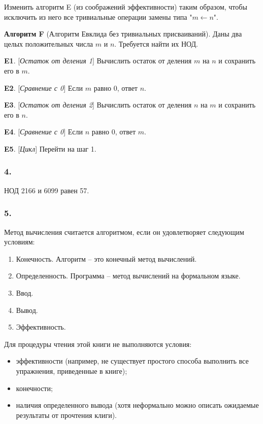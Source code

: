 \documentclass{book}
\begin{document}
Изменить алгоритм E (из соображений эффективности) таким образом, чтобы исключить из него все тривиальные операции замены типа "$m \leftarrow n$".

\textbf{Алгоритм F} (Алгоритм Евклида без тривиальных присваиваний). Даны два целых положительных числа $m$ и $n$. Требуется найти их НОД.

\textbf{E1}. [\textit{Остаток от деления 1}] Вычислить остаток от деления $m$ на $n$ и сохранить его в $m$.

\textbf{E2}. [\textit{Сравнение с 0}] Если $m$ равно 0, ответ $n$.

\textbf{E3}. [\textit{Остаток от деления 2}] Вычислить остаток от деления $n$ на $m$ и сохранить его в $n$.

\textbf{E4}. [\textit{Сравнение с 0}] Если $n$ равно 0, ответ $m$.

\textbf{E5}. [\textit{Цикл}] Перейти на шаг 1.

\subsubsection{4.}

НОД 2166 и 6099 равен 57.

\subsubsection{5.}

Метод вычисления считается алгоритмом, если он удовлетворяет следующим условиям:
\begin{enumerate}
\item Конечность. Алгоритм -- это конечный метод вычислений.
\item Определенность. Программа -- метод вычислений на формальном языке.
\item Ввод.
\item Вывод.
\item Эффективность.
\end{enumerate}

Для процедуры чтения этой книги не выполняются условия:
\begin{itemize}
\item эффективности (например, не существует простого способа выполнить все упражнения, приведенные в книге);
\item конечности;
\item наличия определенного вывода (хотя неформально можно описать ожидаемые результаты от прочтения клиги).
\end{itemize}
\end{document}
